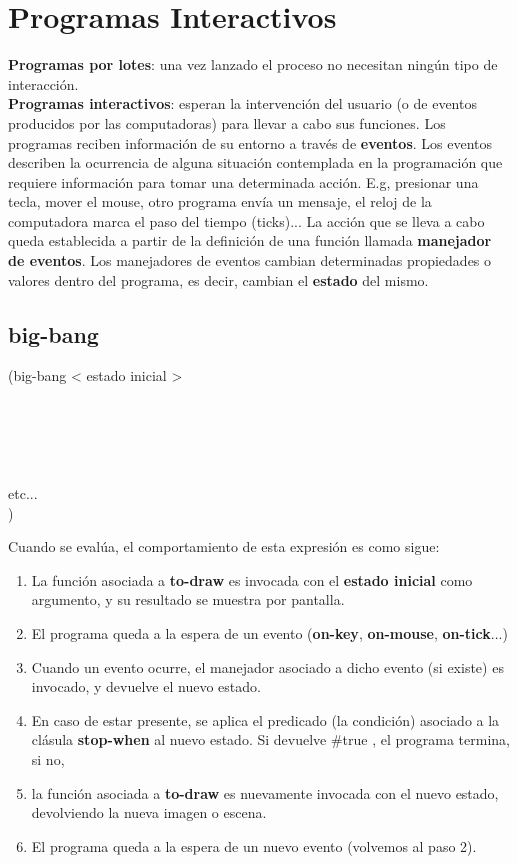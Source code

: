 \documentclass[11pt,a4paper]{article}
\begin{document}
\section{Programas Interactivos}
\textbf{Programas por lotes}: una vez lanzado el proceso no necesitan ningún tipo de interacción.\\
\textbf{Programas interactivos}: esperan la intervención del usuario (o de eventos producidos por las computadoras) para llevar a cabo sus funciones. Los programas reciben información de su entorno a través de \textbf{eventos}. Los eventos describen la ocurrencia de alguna situación contemplada en la programación que requiere información para tomar una determinada acción. E.g, presionar una tecla, mover el mouse, otro programa env\'ia un mensaje, el reloj de la computadora marca el paso del tiempo (ticks)... La acción que se lleva a cabo queda establecida a partir de la definición de una función llamada \textbf{manejador de eventos}. Los manejadores de eventos cambian determinadas propiedades o valores dentro del programa, es decir, cambian el \textbf{estado} del mismo.

\subsection{big-bang}
\begin{siderules}
(big-bang < estado inicial >\\
\indent {}\\
\indent {}\\
\indent {}\\
\indent {}\\
\indent {}\\
\indent \indent etc...\\
\indent \indent )
\end{siderules}

\newpage
Cuando se evalúa, el comportamiento de esta expresión es como sigue:
\begin{enumerate}
\item La función asociada a \textbf{to-draw} es invocada con el \textbf{estado inicial} como argumento, y su resultado se muestra por pantalla.
\item El programa queda a la espera de un evento (\textbf{on-key}, \textbf{on-mouse}, \textbf{on-tick}...)
\item Cuando un evento ocurre, el manejador asociado a dicho evento (si existe) es invocado, y devuelve el nuevo estado.
\item En caso de estar presente, se aplica el predicado (la condición) asociado a la clásula \textbf{stop-when} al nuevo estado. Si devuelve \#true , el programa termina, si no,
\item la función asociada a \textbf{to-draw} es nuevamente invocada con el nuevo estado, devolviendo la nueva imagen o escena.
\item El programa queda a la espera de un nuevo evento (volvemos al paso 2).
\end{enumerate}
\end{document}
